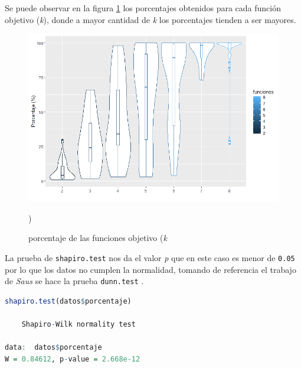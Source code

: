 \documentclass{article}
\begin{document}
Se puede observar en la figura \ref{fig1} los porcentajes obtenidos para cada función objetivo (\textit{k}), donde a mayor cantidad de \textit{k} los porcentajes tienden a ser mayores.

\begin{figure}[htbp]
\centering\includegraphics[width=160mm]{violin11.png}
\caption{porcentaje de las funciones objetivo  (\textit{k}})
\label{fig1}
\end{figure}

La prueba de \texttt{shapiro.test} nos da el valor \textit{p} que en este caso es menor de \texttt{0.05} por lo que los datos no cumplen la normalidad, tomando de referencia el trabajo de \textit{Saus} \cite{saus} se hace la prueba \texttt{dunn.test} \cite{alexis}.

\begin{lstlisting}[language=R]
shapiro.test(datos$porcentaje)

	Shapiro-Wilk normality test

data:  datos$porcentaje
W = 0.84612, p-value = 2.668e-12
\end{lstlisting}
\end{document}
